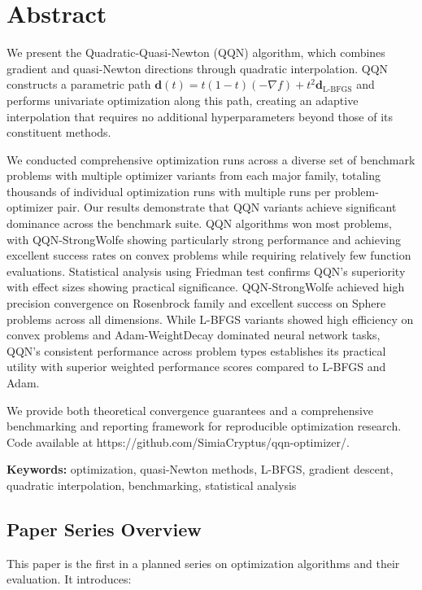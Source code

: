 \hypertarget{abstract}{%
\section{Abstract}\label{abstract}}

We present the Quadratic-Quasi-Newton (QQN) algorithm, which combines gradient and quasi-Newton directions through quadratic interpolation.
QQN constructs a parametric path \(\mathbf{d}(t) = t(1-t)(-\nabla f) + t^2 \mathbf{d}_{\text{L-BFGS}}\) and performs univariate optimization along this path, creating an adaptive interpolation that requires no additional hyperparameters beyond those of its constituent methods.

We conducted comprehensive optimization runs across a diverse set of benchmark problems with multiple optimizer variants from each major family, totaling thousands of individual optimization runs with multiple runs per problem-optimizer pair.
Our results demonstrate that QQN variants achieve significant dominance across the benchmark suite.
QQN algorithms won most problems, with QQN-StrongWolfe showing particularly strong performance and achieving excellent success rates on convex problems while requiring relatively few function evaluations.
Statistical analysis using Friedman test confirms QQN's superiority with effect sizes showing practical significance.
QQN-StrongWolfe achieved high precision convergence on Rosenbrock family and excellent success on Sphere problems across all dimensions.
While L-BFGS variants showed high efficiency on convex problems and Adam-WeightDecay dominated neural network tasks, QQN's consistent performance across problem types establishes its practical utility with superior weighted performance scores compared to L-BFGS and Adam.

We provide both theoretical convergence guarantees and a comprehensive benchmarking and reporting framework for reproducible optimization research.
Code available at https://github.com/SimiaCryptus/qqn-optimizer/.

\textbf{Keywords:} optimization, quasi-Newton methods, L-BFGS, gradient descent, quadratic interpolation, benchmarking, statistical analysis

\hypertarget{paper-series-overview}{%
\subsection{Paper Series Overview}\label{paper-series-overview}}

This paper is the first in a planned series on optimization algorithms and their evaluation. It introduces:

